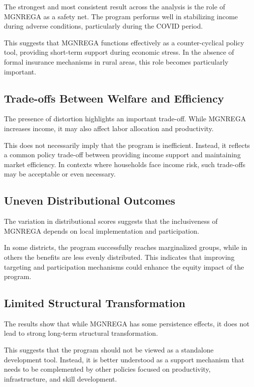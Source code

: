 \documentclass[12pt]{article}
\begin{document}
The strongest and most consistent result across the analysis is the role of MGNREGA as a safety net. The program performs well in stabilizing income during adverse conditions, particularly during the COVID period.

This suggests that MGNREGA functions effectively as a counter-cyclical policy tool, providing short-term support during economic stress. In the absence of formal insurance mechanisms in rural areas, this role becomes particularly important.

\subsection{Trade-offs Between Welfare and Efficiency}

The presence of distortion highlights an important trade-off. While MGNREGA increases income, it may also affect labor allocation and productivity.

This does not necessarily imply that the program is inefficient. Instead, it reflects a common policy trade-off between providing income support and maintaining market efficiency. In contexts where households face income risk, such trade-offs may be acceptable or even necessary.

\subsection{Uneven Distributional Outcomes}

The variation in distributional scores suggests that the inclusiveness of MGNREGA depends on local implementation and participation.

In some districts, the program successfully reaches marginalized groups, while in others the benefits are less evenly distributed. This indicates that improving targeting and participation mechanisms could enhance the equity impact of the program.

\subsection{Limited Structural Transformation}

The results show that while MGNREGA has some persistence effects, it does not lead to strong long-term structural transformation.

This suggests that the program should not be viewed as a standalone development tool. Instead, it is better understood as a support mechanism that needs to be complemented by other policies focused on productivity, infrastructure, and skill development.
\end{document}
